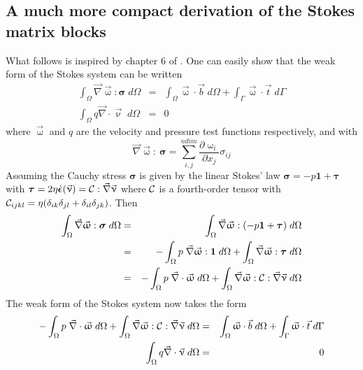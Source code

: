 \subsection{A much more compact derivation of the Stokes matrix blocks \label{sss:KGGT}}

What follows is inspired by chapter 6 of \textcite{dohu03}.
One can easily show that the weak form of the Stokes system can be written 
\begin{eqnarray}
\int_\Omega \vec\nabla \vec{\upomega} : {\bm \sigma} \; d\Omega
&=& \int_\Omega \vec\upomega \cdot \vec{b} \; d\Omega + \int_\Gamma \vec\upomega \cdot \vec{t} \; d\Gamma \\
\int_\Omega q \vec\nabla \cdot \vec{\upnu} \; d\Omega &=& 0
\end{eqnarray}
where $\vec\upomega$ and $q$ are the velocity and pressure test functions respectively, 
and with 
\[
\vec\nabla \vec{\upomega} :\ {\bm \sigma} 
= \sum_{i,j}^{ndim} \frac{\partial \upomega _i}{\partial x_j} \sigma_{ij}
\]
Assuming the Cauchy stress ${\bm \sigma}$ is given by the linear Stokes' law
${\bm \sigma} = -p {\bm 1} + {\bm \tau}$ with 
${\bm \tau} = 2\eta \dot{\bm \epsilon}(\vec\upnu) = {\cal C}: \vec\nabla\vec\upnu$
where ${\cal C}$ is a fourth-order tensor with 
${\cal C}_{ijkl} = \eta (\delta_{ik} \delta_{jl}+ \delta_{il}\delta_{jk})$. 
Then 
\begin{eqnarray}
\int_\Omega \vec\nabla \vec{\upomega} : {\bm \sigma} \; d\Omega
&=& \int_\Omega \vec\nabla \vec{\upomega} : ( -p {\bm 1} + {\bm \tau}) \; d\Omega \nonumber\\
&=& - \int_\Omega p \; \vec\nabla  \vec{\upomega} : {\bm 1}  \; d\Omega 
+ \int_\Omega \vec\nabla \vec{\upomega} : {\bm \tau} \; d\Omega \nonumber\\
&=& - \int_\Omega p \; \vec\nabla\cdot  \vec{\upomega}   \; d\Omega 
+ \int_\Omega \vec\nabla \vec{\upomega} : {\cal C} : \vec\nabla \vec\upnu\; d\Omega 
\end{eqnarray}
The weak form of the Stokes system now takes the form
\begin{eqnarray}
- \int_\Omega p \; \vec\nabla\cdot  \vec{\upomega}   \; d\Omega 
+ \int_\Omega \vec\nabla \vec{\upomega} : {\cal C} : \vec\nabla \vec\upnu\; d\Omega 
&=& \int_\Omega \vec\upomega \cdot \vec{b} \; d\Omega + \int_\Gamma \vec\upomega \cdot \vec{t} \; d\Gamma \\
\int_\Omega q \vec\nabla \cdot \vec{\upnu} \; d\Omega &=& 0
\end{eqnarray}
